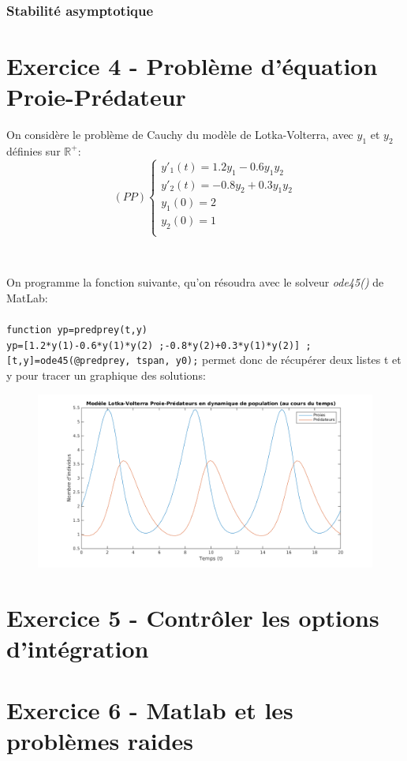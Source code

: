 \documentclass[a4paper,12pt,landscape]{article}
\begin{document}
\subsubsection{Stabilité asymptotique}

\subsection{}

\section{Exercice 4 - Problème d'équation Proie-Prédateur}
On considère le problème de Cauchy du modèle de Lotka-Volterra, avec $y_1$ et $y_2$ définies sur $\mathbb{R}^+$:
$$
(PP)
\left \{
\begin{array}{l}
	y'_1(t)=1.2y_1-0.6y_1y_2\\
	y'_2(t)=-0.8y_2+0.3y_1y_2\\
	y_1(0)=2\\
	y_2(0)=1\\
\end{array}
\right.$$\\
\subsection{}

\newpage
\subsection{}

On programme la fonction suivante, qu'on résoudra avec le solveur \textit{ode45()} de MatLab:\\
 \\
\texttt{function yp=predprey(t,y)\\
yp=[1.2*y(1)-0.6*y(1)*y(2) ;-0.8*y(2)+0.3*y(1)*y(2)] ;}\\

\texttt{[t,y]=ode45(@predprey, tspan, y0);} permet donc de récupérer deux listes t et y pour tracer un graphique des solutions:
\begin{figure}[h!]
	\centering
	\includegraphics[scale=0.5]{exo4EDOpredpreybis.png}
\end{figure}

\section{Exercice 5 - Contrôler les options d'intégration}
\section{Exercice 6 - Matlab et les problèmes raides}
\end{document}
